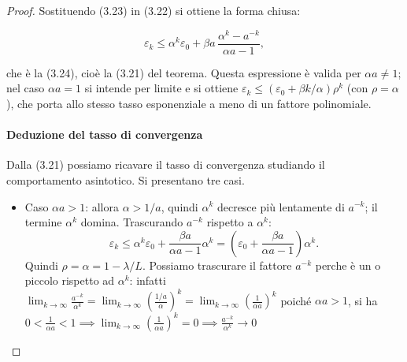 \documentclass[a4paper,12pt]{article}
\begin{document}
\begin{proof}
Sostituendo (3.23) in (3.22) si ottiene la forma chiusa:

\begin{equation}
\varepsilon_k \le \alpha^k \varepsilon_0 + \beta a\,\frac{\alpha^k - a^{-k}}{\alpha a - 1}, \tag{3.24}
\end{equation}

che è la (3.24), cioè la (3.21) del teorema. Questa espressione è valida per $\alpha a \neq 1$; nel caso $\alpha a = 1$ si intende per limite e si ottiene $\varepsilon_k \le (\varepsilon_0 + \beta k/\alpha)\rho^k$ (con $\rho = \alpha$), che porta allo stesso tasso esponenziale a meno di un fattore polinomiale.

\paragraph{Deduzione del tasso di convergenza}

Dalla (3.21) possiamo ricavare il tasso di convergenza studiando il comportamento asintotico. Si presentano tre casi.

\begin{itemize}

\item Caso $\alpha a > 1$: allora $\alpha > 1/a$, quindi $\alpha^k$ decresce più lentamente di $a^{-k}$; il termine $\alpha^k$ domina. Trascurando $a^{-k}$ rispetto a $\alpha^k$:
\[
\varepsilon_k \le \alpha^k \varepsilon_0 + \frac{\beta a}{\alpha a - 1} \alpha^k
= \left(\varepsilon_0 + \frac{\beta a}{\alpha a - 1}\right) \alpha^k.
\]
Quindi $\rho = \alpha = 1 - \lambda/L$.
Possiamo trascurare il fattore $a^{-k}$ perche è un o piccolo rispetto ad $\alpha^k$: infatti $\lim_{k \to \infty} \frac{a^{-k}}{\alpha^k} = \lim_{k \to \infty} \left(\frac{1/a}{\alpha}\right)^k = \lim_{k \to \infty} \left(\frac{1}{\alpha a}\right)^k$ poiché $\alpha a > 1$, si ha $0 < \frac{1}{\alpha a} < 1 \implies \lim_{k \to \infty} \left(\frac{1}{\alpha a}\right)^k = 0 \implies \frac{a^{-k}}{\alpha^k} \to 0$


\end{itemize}
\end{proof}
\end{document}

